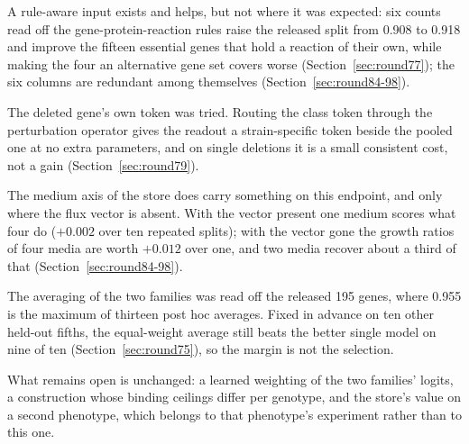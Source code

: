 A rule-aware input exists and helps, but not where it was expected: six counts read off
the gene-protein-reaction rules raise the released split from 0.908 to 0.918 and improve
the fifteen essential genes that hold a reaction of their own, while making the four an
alternative gene set covers worse (Section~\ref{sec:round77}); the six columns are
redundant among themselves (Section~\ref{sec:round84-98}).

The deleted gene's own token was tried. Routing the class token through the perturbation
operator gives the readout a strain-specific token beside the pooled one at no extra
parameters, and on single deletions it is a small consistent cost, not a gain
(Section~\ref{sec:round79}).

The medium axis of the store does carry something on this endpoint, and only where the
flux vector is absent. With the vector present one medium scores what four do
($+0.002$ over ten repeated splits); with the vector gone the growth ratios of four media
are worth $+0.012$ over one, and two media recover about a third of that
(Section~\ref{sec:round84-98}).

The averaging of the two families was read off the released 195 genes, where 0.955 is the
maximum of thirteen post hoc averages. Fixed in advance on ten other held-out fifths, the
equal-weight average still beats the better single model on nine of ten
(Section~\ref{sec:round75}), so the margin is not the selection.

What remains open is unchanged: a learned weighting of the two families' logits, a
construction whose binding ceilings differ per genotype, and the store's value on a
second phenotype, which belongs to that phenotype's experiment rather than to this one.
